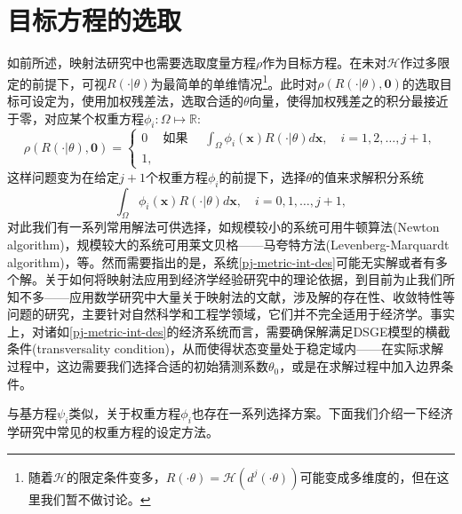 \section{目标方程的选取}
\label{eq:pj-metric}
如前所述，映射法研究中也需要选取度量方程$\rho$作为目标方程。在未对$\mathcal{H}$作过多限定的前提下，可视$R(\cdot | \theta)$为最简单的单维情况\footnote{随着$\mathcal{H}$的限定条件变多，$R(\cdot \theta) = \mathcal{H} \left( d^j \left(\cdot \theta \right) \right)$可能变成多维度的，但在这里我们暂不做讨论。}。此时对$\rho \left( R \left( \cdot| \theta \right), \bm{0} \right)$的选取目标可设定为，使用加权残差法，选取合适的$\theta$向量，使得加权残差之的积分最接近于零，对应某个权重方程$\phi_i : \Omega \mapsto \mathbb{R}$:
\begin{equation*}
  \rho \left( R \left( \cdot| \theta \right), \bm{0} \right) = \begin{cases}
  0 & \text{如果 } \quad \int_{\Omega} \phi_i(\bm{x}) R \left( \cdot | \theta \right) d \bm{x}, \quad i = 1,2,\ldots,j+1,\\
  1,
  \end{cases}
\end{equation*}
这样问题变为在给定$j+1$个权重方程$\phi_{i}$的前提下，选择$\theta$的值来求解积分系统
\begin{equation}
  \label{pj-metric-int-des}
  \int_{\Omega} \phi_i(\bm{x}) R(\cdot | \theta) d \bm{x}, \quad  i=0,1,\ldots,j+1,
\end{equation}
对此我们有一系列常用解法可供选择，如规模较小的系统可用牛顿算法(Newton algorithm)，规模较大的系统可用莱文贝格——马夸特方法(Levenberg-Marquardt algorithm)，等。然而需要指出的是，系统\eqref{pj-metric-int-des}可能无实解或者有多个解。关于如何将映射法应用到经济学经验研究中的理论依据，到目前为止我们所知不多——应用数学研究中大量关于映射法的文献，涉及解的存在性、收敛特性等问题的研究，主要针对自然科学和工程学领域，它们并不完全适用于经济学。事实上，对诸如\eqref{pj-metric-int-des}的经济系统而言，需要确保解满足DSGE模型的横截条件(transversality condition)，从而使得状态变量处于稳定域内——在实际求解过程中，这边需要我们选择合适的初始猜测系数$\theta_0$，或是在求解过程中加入边界条件。

与基方程$\psi_i$类似，关于权重方程$\phi_i$也存在一系列选择方案。下面我们介绍一下经济学研究中常见的权重方程的设定方法。

